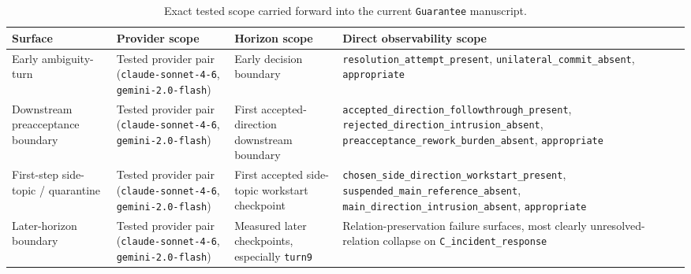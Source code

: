 \documentclass[11pt]{article}
\begin{document}
\begin{table}[ht]
\centering
\begin{tabular}{|p{}|p{}|p{}|p{}|}
\hline
\textbf{Surface} & \textbf{Provider scope} & \textbf{Horizon scope} & \textbf{Direct observability scope} \\
\hline
Early ambiguity-turn & Tested provider pair (\texttt{claude-sonnet-4-6}, \texttt{gemini-2.0-flash}) & Early decision boundary & \texttt{resolution\_attempt\_present}, \texttt{unilateral\_commit\_absent}, \texttt{appropriate} \\
\hline
Downstream preacceptance boundary & Tested provider pair (\texttt{claude-sonnet-4-6}, \texttt{gemini-2.0-flash}) & First accepted-direction downstream boundary & \texttt{accepted\_direction\_followthrough\_present}, \texttt{rejected\_direction\_intrusion\_absent}, \texttt{preacceptance\_rework\_burden\_absent}, \texttt{appropriate} \\
\hline
First-step side-topic / quarantine & Tested provider pair (\texttt{claude-sonnet-4-6}, \texttt{gemini-2.0-flash}) & First accepted side-topic workstart checkpoint & \texttt{chosen\_side\_direction\_workstart\_present}, \texttt{suspended\_main\_reference\_absent}, \texttt{main\_direction\_intrusion\_absent}, \texttt{appropriate} \\
\hline
Later-horizon boundary & Tested provider pair (\texttt{claude-sonnet-4-6}, \texttt{gemini-2.0-flash}) & Measured later checkpoints, especially \texttt{turn9} & Relation-preservation failure surfaces, most clearly unresolved-relation collapse on \texttt{C\_incident\_response} \\
\hline
\end{tabular}
\caption{Exact tested scope carried forward into the current \texttt{Guarantee}
manuscript.}
\end{table}
\end{document}
